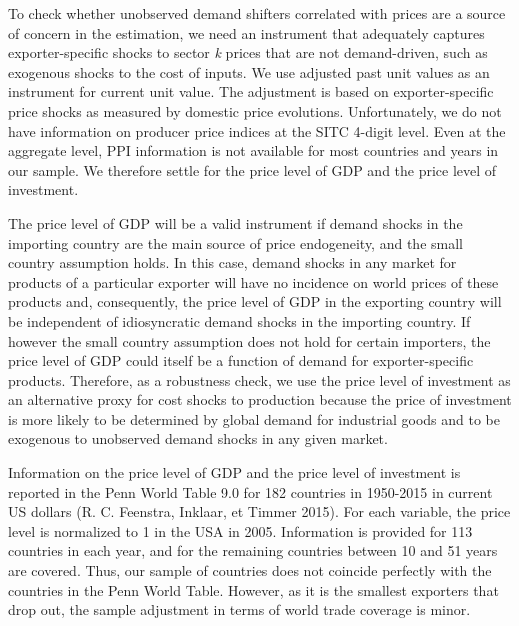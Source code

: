 \documentclass[12pt,twoside,a4paper,notitlepage]{article}
\begin{document}
{To check whether unobserved demand shifters correlated with prices are a source of concern in the estimation, we need an instrument that adequately captures exporter-specific shocks to sector \textit{k} prices that are not demand-driven, such as exogenous shocks to the cost of inputs. We use adjusted past unit values as an instrument for current unit value. The adjustment is based on exporter-specific price shocks as measured by domestic price evolutions. Unfortunately, we do not have information on producer price indices at the SITC 4-digit level. Even at the aggregate level, PPI information is not available for most countries and years in our sample. We therefore settle for the price level of GDP and the price level of investment.

The price level of GDP will be a valid instrument if demand shocks in the importing country are the main source of price endogeneity, and the small country assumption holds. In this case, demand shocks in any market for products of a particular exporter will have no incidence on world prices of these products and, consequently, the price level of GDP in the exporting country will be independent of idiosyncratic demand shocks in the importing country. If however the small country assumption does not hold for certain importers, the price level of GDP could itself be a function of demand for exporter-specific products. Therefore, as a robustness check, we use the price level of investment as an alternative proxy for cost shocks to production because the price of investment is more likely to be determined by global demand for industrial goods and to be exogenous to unobserved demand shocks in any given market. 

Information on the price level of GDP and the price level of investment is reported in the Penn World Table 9.0 for 182 countries in 1950-2015 in current US dollars (R. C. Feenstra, Inklaar, et Timmer 2015). For each variable, the price level is normalized to 1 in the USA in 2005. Information is provided for 113 countries in each year, and for the remaining countries between 10 and 51 years are covered. Thus, our sample of countries does not coincide perfectly with the countries in the Penn World Table. However, as it is the smallest exporters that drop out, the sample adjustment in terms of world trade coverage is minor.

}
\end{document}
